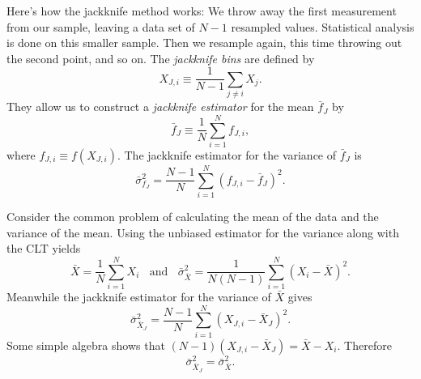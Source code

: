 Here's how the jackknife method works: We throw away the first measurement 
from our sample, leaving a data set of $N-1$ resampled values. Statistical
analysis is done on this smaller sample. Then we resample again, this time
throwing out the second point, and so on.
The {\it jackknife bins} are defined by
\begin{equation}
  X_{J,i}\equiv\frac{1}{N-1}\sum_{j\neq i}X_j.
\end{equation}
They allow us to construct a {\it jackknife estimator}
 for the mean $\bar{f}_J$ by
\begin{equation}\label{eq:jackmean}
  \bar{f}_J\equiv\frac{1}{N}\sum_{i=1}^N f_{J,i},
\end{equation}
where $f_{J,i}\equiv f(X_{J,i})$. The jackknife estimator for the 
variance of $\bar{f}_J$ is
\begin{equation}\label{eq:jackvar}
  \bar\sigma^2_{f_J}=\frac{N-1}{N}\sum_{i=1}^N(f_{J,i}-\bar{f}_J)^2.
\end{equation}
\begin{example*}{}{}
  Consider the common problem of calculating the mean of the data and
  the variance of the mean. Using the unbiased estimator for the variance
  along with the CLT yields
  \begin{equation}
    \bar{X}=\frac{1}{N}\sum_{i=1}^N X_i~~~~\text{and}~~~~
     \bar{\sigma}^2_{\bar{X}}=\frac{1}{N(N-1)}\sum_{i=1}^N(X_i-\bar{X})^2.
  \end{equation}
  Meanwhile the jackknife estimator for the variance of $\bar{X}$ gives
  \begin{equation}
    \bar\sigma_{\bar{X}_J}^2=\frac{N-1}{N}\sum_{i=1}^N(X_{J,i}-\bar{X}_J)^2.
  \end{equation}
  Some simple algebra shows that $(N-1)(X_{J,i}-\bar{X}_J)=\bar{X}-X_i$.
  Therefore
  \begin{equation}
    \bar\sigma_{\bar{X}_J}^2=\bar{\sigma}^2_{\bar{X}}.
  \end{equation}
\end{example*}

